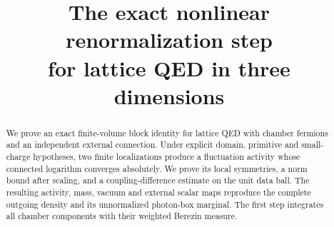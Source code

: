 \documentclass[11pt,letterpaper,reqno]{amsart}
\title[The exact nonlinear renormalization step]
{The exact nonlinear renormalization step\\for lattice QED in three dimensions}
\date{}
\begin{document}
\begin{abstract}
We prove an exact finite-volume block identity for lattice QED with
chamber fermions and an independent external connection. Under explicit
domain, primitive and small-charge hypotheses, two finite localizations
produce a fluctuation activity whose connected logarithm converges
absolutely. We prove its local symmetries, a norm bound after scaling,
and a coupling-difference estimate on the unit data ball. The resulting
activity, mass, vacuum and external scalar maps reproduce the complete
outgoing density and its unnormalized photon-box marginal. The first
step integrates all chamber components with their weighted Berezin
measure.
\end{abstract}
\maketitle
\tableofcontents









\printbibliography
\end{document}
